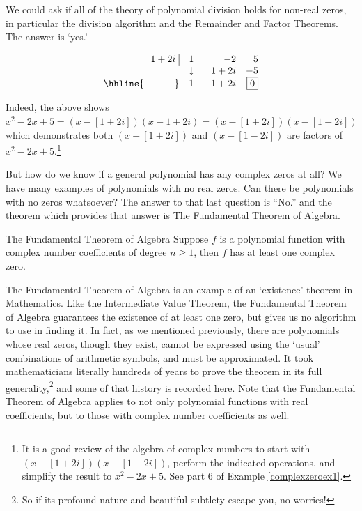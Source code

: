 We could ask if all of the theory of polynomial division %
holds for non-real zeros, in particular the division algorithm and the Remainder and Factor Theorems.  The answer is `yes.'  

\[\begin{array}{rrrr}
1+2i \, \, \vline & 1 & -2 & 5 \\

  & \downarrow   &  1+2i  &  -5 \\ \hhline{~---} 
  
  & 1 & -1+2i &  \fbox{$0$}   \\

\end{array}\]


Indeed, the above shows $x^2-2x+5  = (x-[1+2i])(x-1+2i)= (x-[1+2i])(x-[1-2i])$ which demonstrates both  $(x-[1+2i])$ and  $(x-[1-2i])$ are factors of $x^2-2x+5$.\footnote{It is a good review of the algebra of complex numbers to start with  $(x-[1+2i])(x-[1-2i])$, perform the indicated operations, and simplify the result to $x^2-2x+5$.  See part 6 of  Example \ref{complexzeroex1}.}%


 But how do we know if a general polynomial has any complex zeros at all?  We have many examples of polynomials with no real zeros.  Can there be polynomials with no zeros whatsoever?  The answer to that last question is ``No.'' and the theorem which provides that answer is  The Fundamental Theorem of Algebra.

\begin{theorem1}[ftoa]{The Fundamental Theorem of Algebra} Suppose $f$ is a polynomial function with complex number coefficients of degree $n \geq 1$, then $f$ has at least one complex zero.

\end{theorem1}

The Fundamental Theorem of Algebra is an example of an `existence' theorem in Mathematics.  Like the Intermediate Value Theorem, %
the Fundamental Theorem of Algebra  guarantees the existence of at least one zero, but gives us no algorithm to use in finding it.  In fact, as we mentioned previously, there are polynomials whose real zeros, though they exist, cannot be expressed using the `usual' combinations of arithmetic symbols, and must be approximated.  It took mathematicians literally hundreds of years to prove the theorem in its full generality,\footnote{So if its profound nature and beautiful subtlety escape you, no worries!} and some of that history is recorded \href{http://en.wikipedia.org/wiki/Fundamental_theorem_of_algebra}{\underline{here}}.  Note that the Fundamental Theorem of Algebra  applies to not only polynomial functions with real coefficients, but to those with complex number coefficients as well.  

